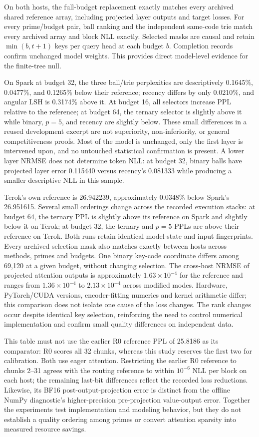 \documentclass[11pt]{article}
\begin{document}
On both hosts, the full-budget replacement exactly matches every archived
shared reference array, including projected layer outputs and target losses.
For every prime/budget pair, ball ranking and the independent same-code trie
match every archived array and block NLL exactly. Selected masks are causal and retain
\(\min(b,t+1)\) keys per query head at each budget \(b\). Completion records confirm unchanged model
weights. This provides direct model-level evidence for the finite-tree null.

On Spark at budget 32, the three ball/trie perplexities are descriptively 0.1645\%,
0.0477\%, and 0.1265\% below their reference; recency differs by only 0.0210\%,
and angular LSH is 0.3174\% above it. At budget 16, all selectors increase PPL
relative to the reference; at budget 64, the ternary selector is slightly above
it while binary, \(p=5\), and recency are slightly below. These small differences
in a reused development excerpt are not superiority, non-inferiority, or general
competitiveness proofs. Most of the model is unchanged, only the first layer is
intervened upon, and no untouched statistical confirmation is present. A lower layer
NRMSE does not determine token NLL: at budget 32, binary balls have projected
layer error 0.115440 versus recency's 0.081333 while producing a smaller
descriptive NLL in this sample.

Terok's own reference is 26.942239, approximately 0.0348\% below Spark's
26.951615. Several small orderings change across the recorded execution
stacks: at budget 64, the ternary PPL is slightly above its reference on Spark
and slightly below it on Terok; at budget 32, the ternary and \(p=5\) PPLs are
above their reference on Terok. Both runs retain identical model-state and
input fingerprints. Every archived selection mask also matches exactly between
hosts across methods, primes and budgets. One binary key-code coordinate differs
among 69,120 at a given budget, without changing selection. The cross-host NRMSE
of projected attention outputs is approximately \(1.63\times10^{-4}\) for the
reference and ranges from \(1.36\times10^{-4}\) to \(2.13\times10^{-4}\) across
modified modes. Hardware, PyTorch/CUDA versions, encoder-fitting numerics and
kernel arithmetic differ; this comparison does not isolate one cause of the
loss changes. The rank changes occur despite identical key selection, reinforcing
the need to control numerical implementation and confirm small quality
differences on independent data.

This table must not use the earlier R0 reference PPL of 25.8186 as its
comparator: R0 scores all 32 chunks, whereas this study reserves the first two
for calibration. Both use eager attention. Restricting the earlier R0 reference
to chunks 2--31 agrees with the routing reference to within \(10^{-6}\) NLL per
block on each host; the remaining last-bit differences reflect the recorded
loss reductions.
Likewise, its BF16 post-output-projection error is distinct from the offline
NumPy diagnostic's higher-precision pre-projection value-output error.
Together the experiments test implementation and modeling behavior, but they
do not establish a quality ordering among primes or convert attention sparsity
into measured resource savings.
\end{document}
